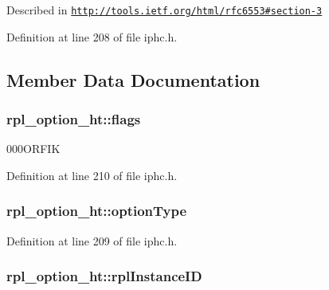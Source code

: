 Described in \href{http://tools.ietf.org/html/rfc6553#section-3}{\tt http\+://tools.\+ietf.\+org/html/rfc6553\#section-\/3} 

Definition at line 208 of file iphc.\+h.



\subsection{Member Data Documentation}
\subsubsection[{\texorpdfstring{flags}{flags}}]{ rpl\+\_\+option\+\_\+ht\+::flags}\hypertarget{structrpl__option__ht_a6427b5529b4ca8f086e1893a1c83a614}{}\label{structrpl__option__ht_a6427b5529b4ca8f086e1893a1c83a614}


000\+O\+R\+F\+IK 



Definition at line 210 of file iphc.\+h.

\subsubsection[{\texorpdfstring{option\+Type}{optionType}}]{ rpl\+\_\+option\+\_\+ht\+::option\+Type}\hypertarget{structrpl__option__ht_a6c8c2bdc4432ae3e2a013fb727ada959}{}\label{structrpl__option__ht_a6c8c2bdc4432ae3e2a013fb727ada959}


Definition at line 209 of file iphc.\+h.

\subsubsection[{\texorpdfstring{rpl\+Instance\+ID}{rplInstanceID}}]{ rpl\+\_\+option\+\_\+ht\+::rpl\+Instance\+ID}\hypertarget{structrpl__option__ht_a3888e0a293a042fb8f9db203ad4ce462}{}\label{structrpl__option__ht_a3888e0a293a042fb8f9db203ad4ce462}


